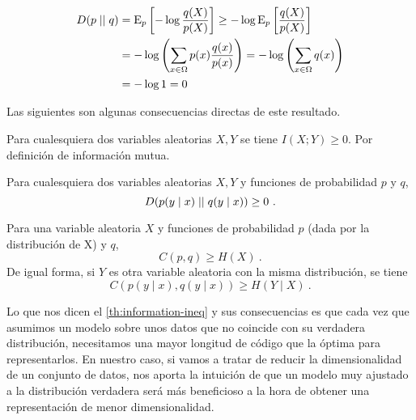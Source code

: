 \begin{align*}
  D(p\mid\mid q)&=\mathrm{E}_p\left[-\log\frac{q(X)}{p(X)}\right]\geq -\log\mathrm{E}_p\left[\frac{q(X)}{p(X)}\right]\\
            &=-\log\left(\sum_{x\in\Omega}p(x)\frac{q(x)}{p(x)}\right)=-\log\left(\sum_{x\in\Omega}q(x)\right)\\
            &=-\log 1= 0
\end{align*}

\proofe
\theoe

Las siguientes son algunas consecuencias directas de este resultado.

Para cualesquiera dos variables aleatorias \(X, Y\) se tiene
\(I(X;Y)\geq 0\). \proofb
Por definición de información mutua. \proofe
\core

\corb
Para cualesquiera dos variables aleatorias \(X, Y\) y funciones de
probabilidad \(p\) y \(q\), \[D(p(y\mid x)\mid\mid q(y\mid x))\geq 0~.\]
\core

\corb
Para una variable aleatoria \(X\) y funciones de probabilidad \(p\)
(dada por la distribución de X) y \(q\), \[C(p, q)\geq H(X)~.\] De igual
forma, si \(Y\) es otra variable aleatoria con la misma distribución, se
tiene \[C(p(y\mid x), q(y\mid x))\geq H(Y\mid X)~.\] \core

Lo que nos dicen el \autoref{th:information-ineq} y sus consecuencias es que cada vez que asumimos un modelo sobre unos datos que no coincide con su verdadera distribución, necesitamos una mayor longitud de código que la óptima para representarlos. En nuestro caso, si vamos a tratar de reducir la dimensionalidad de un conjunto de datos, nos aporta la intuición de que un modelo muy ajustado a la distribución verdadera será más beneficioso a la hora de obtener una representación de menor dimensionalidad.